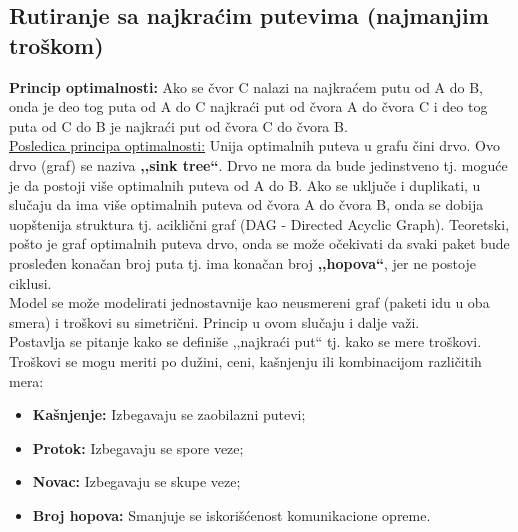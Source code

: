 \documentclass[a4paper]{article}
\begin{document}
    \subsection{Rutiranje sa najkraćim putevima (najmanjim troškom)}
        \textbf{Princip optimalnosti:} Ako se čvor C nalazi na najkraćem putu od A do B, onda
        je deo tog puta od A do C najkraći put od čvora A do čvora C i deo tog puta od C do B 
        je najkraći put od čvora C do čvora B. \\
        \indent \underline{Posledica principa optimalnosti:} Unija optimalnih 
        puteva u grafu čini drvo. Ovo
        drvo (graf) se naziva \textbf{,,sink tree``}. Drvo ne mora da bude jedinstveno tj. moguće je
        da postoji više optimalnih puteva od A do B. Ako se uključe i duplikati, u slučaju
        da ima više optimalnih puteva od čvora A do čvora B, onda se
        dobija uopštenija struktura tj. aciklični graf (DAG - Directed Acyclic Graph). Teoretski, 
        pošto je graf optimalnih 
        puteva drvo, onda se može očekivati da svaki paket bude prosleđen konačan broj puta tj. 
        ima konačan broj \textbf{,,hopova``}, jer ne postoje ciklusi. \\
        \indent Model se može modelirati jednostavnije kao neusmereni graf (paketi idu u oba
        smera) i troškovi su simetrični. Princip u ovom slučaju i dalje važi. \\
        \indent Postavlja se pitanje kako se definiše ,,najkraći put`` tj. kako se mere
        troškovi. Troškovi se mogu meriti po dužini, ceni, kašnjenju ili kombinacijom različitih
        mera:
        \begin{itemize}
            \item \textbf{Kašnjenje:} Izbegavaju se zaobilazni putevi;
            \item \textbf{Protok:} Izbegavaju se spore veze;
            \item \textbf{Novac:} Izbegavaju se skupe veze;
            \item \textbf{Broj hopova:} Smanjuje se iskorišćenost komunikacione opreme.
        \end{itemize}
\end{document}
